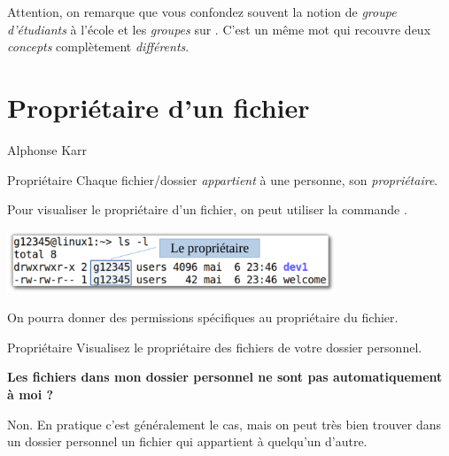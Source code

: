 \documentclass[a4paper,11pt]{style-esi/td}
\begin{document}
		\medskip
		\begin{alertbox}
			Attention, on remarque que vous confondez souvent 
			la notion de \emph{groupe d'étudiants} à l'école
			et les \emph{groupes} sur .
			C'est un même mot qui recouvre deux 
			\emph{concepts} complètement \emph{différents}.
		\end{alertbox}

	\section{Propriétaire d'un fichier}
	
			{Alphonse Karr}
		\vspace{2em}

		\vspace{1em}

		\begin{theorie}{Propriétaire}
			Chaque fichier/dossier \emph{appartient} à une personne, 
			son \emph{propriétaire}.
		\end{theorie}

		Pour visualiser le propriétaire d'un fichier, 
		on peut utiliser la commande .

		\begin{center}
			\includegraphics[height=5em]{image/owner}
		\end{center}

		On pourra donner des permissions spécifiques au propriétaire du fichier.

		\begin{Exercice}{Propriétaire}
			Visualisez le propriétaire des fichiers de votre dossier personnel.
		\end{Exercice}

		\begin{faq}
			\textbf{Les fichiers dans mon dossier personnel ne sont pas 
			automatiquement à moi ?}

			Non. En pratique c'est généralement le cas, 
			mais on peut très bien trouver dans un dossier personnel 
			un fichier qui appartient à quelqu'un d'autre.  
		\end{faq}
\end{document}
